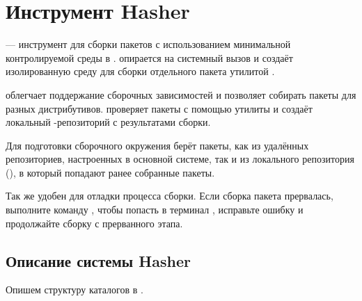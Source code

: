 \hypertarget{5}{\chapter{Инструмент Hasher}}
 --- инструмент для сборки пакетов с использованием минимальной контролируемой 
среды в .  опирается на системный вызов  и создаёт 
изолированную среду для сборки отдельного пакета утилитой .

 облегчает поддержание сборочных зависимостей и позволяет собирать пакеты для 
разных дистрибутивов.  проверяет пакеты с помощью утилиты  
и создаёт локальный -репозиторий с результатами сборки.

Для подготовки сборочного окружения  берёт пакеты, как из удалённых репозиториев, 
настроенных в основной системе, так и из локального репозитория (), 
в который попадают ранее собранные пакеты.

Так же  удобен для отладки процесса сборки. Если сборка пакета прервалась, 
выполните команду , чтобы попасть в терминал , исправьте ошибку 
и продолжайте сборку с прерванного этапа.


\section{Описание системы Hasher}
Опишем структуру каталогов в .

